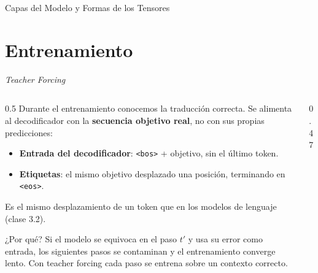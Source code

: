 \documentclass[aspectratio=169, 10pt]{beamer}
\newcommand{\tok}[1]{\texttt{#1}}
\newcommand{\bos}{\tok{<bos>}}
\newcommand{\eos}{\tok{<eos>}}
\begin{document}
\begin{frame}{Capas del Modelo y Formas de los Tensores}
\end{frame}

\section{Entrenamiento}

\begin{frame}{\textit{Teacher Forcing}}

	\begin{columns}[T]
		\begin{column}{0.5\textwidth}
			\small
			Durante el entrenamiento conocemos la traducci\'on correcta. Se alimenta al decodificador con la \textbf{secuencia objetivo real}, no con sus propias predicciones:
			\begin{itemize}
				\item \textbf{Entrada del decodificador}: \bos{} + objetivo, sin el \'ultimo token.
				\item \textbf{Etiquetas}: el mismo objetivo desplazado una posici\'on, terminando en \eos.
			\end{itemize}
			Es el mismo desplazamiento de un token que en los modelos de lenguaje (clase 3.2).

			\begin{block}{¿Por qu\'e?}
				\small
				Si el modelo se equivoca en el paso $t'$ y usa su error como entrada, los siguientes pasos se contaminan y el entrenamiento converge lento. Con teacher forcing cada paso se entrena sobre un contexto correcto.
			\end{block}
		\end{column}

		\begin{column}{0.47\textwidth}
			\centering


\end{column}
\end{columns}
\end{frame}
\end{document}
